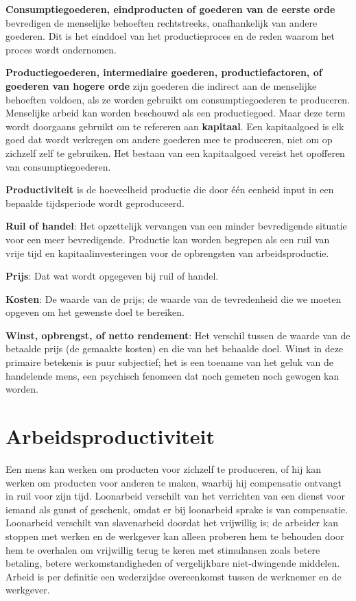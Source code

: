 \documentclass[
  a5paper,
  smalldemyvopaper,11pt,twoside,onecolumn,openright,extrafontsizes,
hidelinks]{memoir}
\begin{document}
\textbf{Consumptiegoederen, eindproducten of goederen van de eerste
orde} bevredigen de menselijke behoeften rechtstreeks, onafhankelijk van
andere goederen. Dit is het einddoel van het productieproces en de reden
waarom het proces wordt ondernomen.

\textbf{Productiegoederen, intermediaire goederen, productiefactoren, of
goederen van hogere orde} zijn goederen die indirect aan de menselijke
behoeften voldoen, als ze worden gebruikt om consumptiegoederen te
produceren. Menselijke arbeid kan worden beschouwd als een
productiegoed. Maar deze term wordt doorgaans gebruikt om te refereren
aan \textbf{kapitaal}. Een kapitaalgoed is elk goed dat wordt verkregen
om andere goederen mee te produceren, niet om op zichzelf zelf te
gebruiken. Het bestaan van een kapitaalgoed vereist het opofferen van
consumptiegoederen.

\textbf{Productiviteit} is de hoeveelheid productie die door één eenheid
input in een bepaalde tijdsperiode wordt geproduceerd.

\textbf{Ruil of handel}: Het opzettelijk vervangen van een minder
bevredigende situatie voor een meer bevredigende. Productie kan worden
begrepen als een ruil van vrije tijd en kapitaalinvesteringen voor de
opbrengsten van arbeidsproductie.

\textbf{Prijs}: Dat wat wordt opgegeven bij ruil of handel.

\textbf{Kosten}: De waarde van de prijs; de waarde van de tevredenheid
die we moeten opgeven om het gewenste doel te bereiken.

\textbf{Winst, opbrengst, of netto rendement}: Het verschil tussen de
waarde van de betaalde prijs (de gemaakte kosten) en die van het
behaalde doel. Winst in deze primaire betekenis is puur subjectief; het
is een toename van het geluk van de handelende mens, een psychisch
fenomeen dat noch gemeten noch gewogen kan worden.

\section{Arbeidsproductiviteit}\label{arbeidsproductiviteit}

Een mens kan werken om producten voor zichzelf te produceren, of hij kan
werken om producten voor anderen te maken, waarbij hij compensatie
ontvangt in ruil voor zijn tijd. Loonarbeid verschilt van het verrichten
van een dienst voor iemand als gunst of geschenk, omdat er bij
loonarbeid sprake is van compensatie. Loonarbeid verschilt van
slavenarbeid doordat het vrijwillig is; de arbeider kan stoppen met
werken en de werkgever kan alleen proberen hem te behouden door hem te
overhalen om vrijwillig terug te keren met stimulansen zoals betere
betaling, betere werkomstandigheden of vergelijkbare niet-dwingende
middelen. Arbeid is per definitie een wederzijdse overeenkomst tussen de
werknemer en de werkgever.
\end{document}
